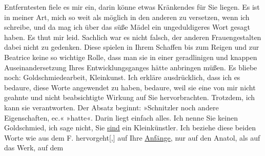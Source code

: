 \begin{ledgroupsized}[t]{13cm}
               Entferntesten fiele es mir ein, darin könne etwas Kränkendes für Sie liegen. Es ist
               in meiner Art, mich so weit als möglich in den anderen zu versetzen, wenn ich
               schreibe, und da mag ich über das süße Mädel ein ungeduldigeres Wort gesagt haben. Es
               thut mir leid. Sachlich war es nicht falsch, der anderen Frauengestalten dabei nicht
               zu gedenken. Diese spielen in Ihrem Schaffen bis zum Reigen und zur Beatrice keine so
               wichtige Rolle, dass man sie  in einer
               geradlinigen und knappen Auseinandersetzung Ihres Entwicklungsganges hätte anbringen
               müßen. \pend
           \pstart
           Es bliebe noch: Goldschmiedearbeit, Kleinkunst. Ich erkläre ausdrücklich, dass ich es
               bedaure, diese Worte angewendet zu haben, bedaure, weil sie eine von mir nicht
               geahnte und nicht beabsichtigte Wirkung auf Sie hervorbrachten. Trotzdem, ich kann
               sie verantworten. Der Absatz beginnt: »Schnitzler  noch andere
                  Eigenschaften, ec.« »hatte«. Darin liegt einfach alles. Ich nenne Sie keinen
               Goldschmied, ich sage nicht, Sie \uline{sind} ein
               Kleinkünstler. Ich beziehe diese beiden Worte wie aus dem F. hervorgeht{[},{]}{ } auf Ihre \uline{Anfänge},
               nur auf den Anatol, als auf das Werk, auf dem

\end{ledgroupsized}
